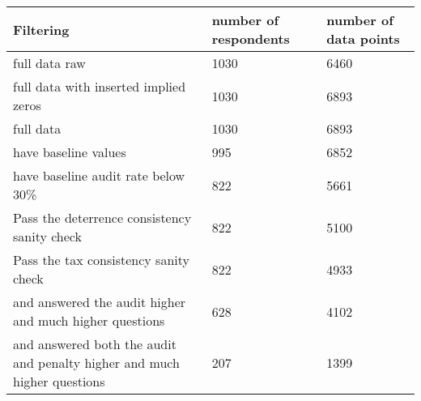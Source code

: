 \begin{table}[ht]
\centering
\begin{tabular}{lll}
  \hline
Filtering & number of respondents & number of data points \\ 
  \hline
full data raw & 1030 & 6460 \\ 
  full data with inserted implied zeros & 1030 & 6893 \\ 
  full data & 1030 & 6893 \\ 
  have baseline values & 995 & 6852 \\ 
  have baseline audit rate below 30\% & 822 & 5661 \\ 
  Pass the deterrence consistency sanity check & 822 & 5100 \\ 
  Pass the tax consistency sanity check & 822 & 4933 \\ 
  and answered the audit higher and much higher questions & 628 & 4102 \\ 
  and answered both the audit and penalty higher and much higher questions & 207 & 1399 \\ 
   \hline
\end{tabular}
\end{table}
